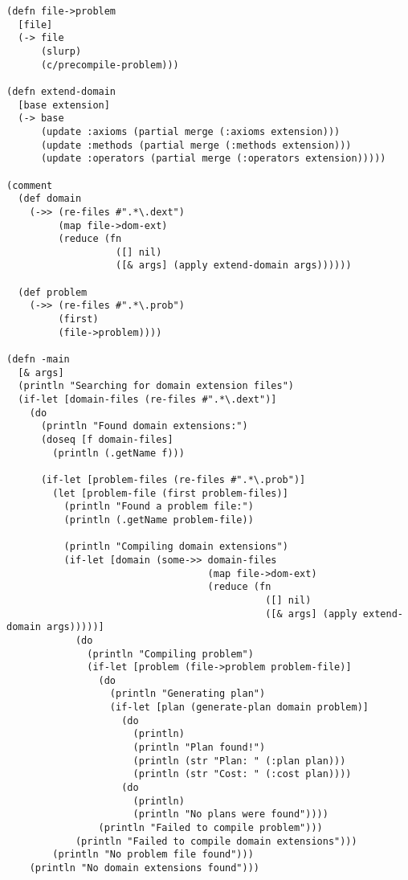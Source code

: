 \begin{lstlisting}
(defn file->problem
  [file]
  (-> file
      (slurp)
      (c/precompile-problem)))

(defn extend-domain
  [base extension]
  (-> base
      (update :axioms (partial merge (:axioms extension)))
      (update :methods (partial merge (:methods extension)))
      (update :operators (partial merge (:operators extension)))))

(comment
  (def domain
    (->> (re-files #".*\.dext")
         (map file->dom-ext)
         (reduce (fn
                   ([] nil)
                   ([& args] (apply extend-domain args))))))

  (def problem
    (->> (re-files #".*\.prob")
         (first)
         (file->problem))))

(defn -main
  [& args]
  (println "Searching for domain extension files")
  (if-let [domain-files (re-files #".*\.dext")]
    (do
      (println "Found domain extensions:")
      (doseq [f domain-files]
        (println (.getName f)))

      (if-let [problem-files (re-files #".*\.prob")]
        (let [problem-file (first problem-files)]
          (println "Found a problem file:")
          (println (.getName problem-file))

          (println "Compiling domain extensions")
          (if-let [domain (some->> domain-files
                                   (map file->dom-ext)
                                   (reduce (fn
                                             ([] nil)
                                             ([& args] (apply extend-domain args)))))]
            (do
              (println "Compiling problem")
              (if-let [problem (file->problem problem-file)]
                (do
                  (println "Generating plan")
                  (if-let [plan (generate-plan domain problem)]
                    (do
                      (println)
                      (println "Plan found!")
                      (println (str "Plan: " (:plan plan)))
                      (println (str "Cost: " (:cost plan))))
                    (do
                      (println)
                      (println "No plans were found"))))
                (println "Failed to compile problem")))
            (println "Failed to compile domain extensions")))
        (println "No problem file found")))
    (println "No domain extensions found")))
\end{lstlisting}

